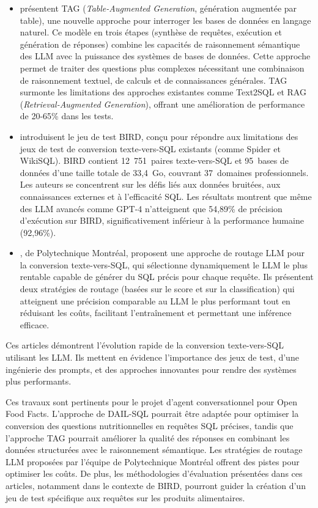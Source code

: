 \documentclass[a4paper,11pt]{article}
\begin{document}
\begin{itemize}
    \item \citet{biswal2024text2sql} présentent TAG (\textit{Table-Augmented Generation}, génération augmentée par table), une nouvelle approche pour interroger les bases de données en langage naturel. Ce modèle en trois étapes (synthèse de requêtes, exécution et génération de réponses) combine les capacités de raisonnement sémantique des LLM avec la puissance des systèmes de bases de données. 
    Cette approche permet de traiter des questions plus complexes nécessitant une combinaison de raisonnement textuel, de calculs et de connaissances générales.
    TAG surmonte les limitations des approches existantes comme Text2SQL et RAG (\textit{Retrieval-Augmented Generation}), offrant une amélioration de performance de 20-65\% dans les tests. 

    \item \citet{li2024can} introduisent le jeu de test BIRD, conçu pour répondre aux limitations des jeux de test de conversion texte-vers-SQL existants (comme Spider et WikiSQL). 
    BIRD contient 12~751~paires texte-vers-SQL et 95~bases de données d'une taille totale de 33,4~Go, couvrant 37~domaines professionnels. 
    Les auteurs se concentrent sur les défis liés aux données bruitées, aux connaissances externes et à l'efficacité SQL. 
    Les résultats montrent que même des LLM avancés comme GPT-4 n'atteignent que 54,89\% de précision d'exécution sur BIRD, significativement inférieur à la performance humaine (92,96\%).

    \item \citet{malekpour2024towards}, de Polytechnique Montréal, proposent une approche de routage LLM pour la conversion texte-vers-SQL, qui sélectionne dynamiquement le LLM le plus rentable capable de générer du SQL précis pour chaque requête. Ils présentent deux stratégies de routage (basées sur le score et sur la classification) qui atteignent une précision comparable au LLM le plus performant tout en réduisant les coûts, facilitant l'entraînement et permettant une inférence efficace.
\end{itemize}

Ces articles démontrent l'évolution rapide de la conversion texte-vers-SQL utilisant les LLM. 
Ils mettent en évidence l'importance des jeux de test, d'une ingénierie des prompts, et des approches innovantes 
pour rendre des systèmes plus performants.

Ces travaux sont pertinents pour le projet d'agent conversationnel pour Open Food Facts. L'approche de DAIL-SQL pourrait être adaptée pour optimiser la conversion des questions nutritionnelles en requêtes SQL précises, tandis que l'approche TAG pourrait améliorer la qualité des réponses en combinant les données structurées avec le raisonnement sémantique. Les stratégies de routage LLM proposées par l'équipe de Polytechnique Montréal offrent des pistes pour optimiser les coûts. De plus, les méthodologies d'évaluation présentées dans ces articles, notamment dans le contexte de BIRD, pourront guider la création d'un jeu de test spécifique aux requêtes sur les produits alimentaires.
\end{document}
